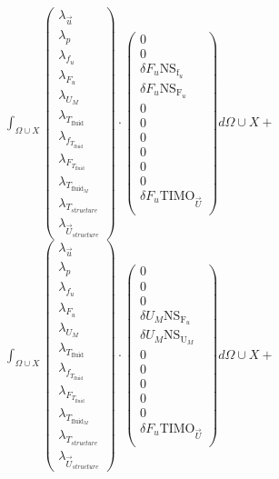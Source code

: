 \documentclass[10pt]{article} %
\begin{document}
\begin{center}
	$\int_{\Omega \cup X}
	\begin{pmatrix}
		\lambda_{\vec{u}} \\ \lambda_p \\ \lambda_{f_u} \\ \lambda_{F_u} \\ \lambda_{U_M}\\ \lambda_{T_{\text{fluid}}} \\ \lambda_{f_{T_{\text{fluid}}}} \\ \lambda_{F_{T_{\text{fluid}}}} \\ \lambda_{T_{\text{fluid}_M}} \\ \lambda_{T_{structure}} \\ \lambda_{\vec{U}_{structure}}
	\end{pmatrix}
	\cdot
	\begin{pmatrix}
		0\\
		0\\
		\delta F_u \text{NS}_{\text{f}_u} \\
		\delta F_u \text{NS}_{\text{F}_u} \\
		0\\
		0\\
		0\\
		0\\
		0\\
		0\\
		\delta F_u \text{TIMO}_{\vec{U}}\\
	\end{pmatrix}
	d\Omega \cup X + $\\

	$\int_{\Omega \cup X}
	\begin{pmatrix}
		\lambda_{\vec{u}} \\ \lambda_p \\ \lambda_{f_u} \\ \lambda_{F_u} \\ \lambda_{U_M}\\ \lambda_{T_{\text{fluid}}} \\ \lambda_{f_{T_{\text{fluid}}}} \\ \lambda_{F_{T_{\text{fluid}}}} \\ \lambda_{T_{\text{fluid}_M}} \\ \lambda_{T_{structure}} \\ \lambda_{\vec{U}_{structure}}
	\end{pmatrix}
	\cdot
	\begin{pmatrix}
		0 \\
		0\\
		0 \\
		\delta U_M \text{NS}_{\text{F}_u} \\
		\delta U_M \text{NS}_{\text{U}_M} \\
		0 \\
		0\\
		0\\
		0\\
		0\\
		\delta F_u \text{TIMO}_{\vec{U}}\\
	\end{pmatrix}
	d\Omega \cup X + $\\


\end{center}
\end{document}
